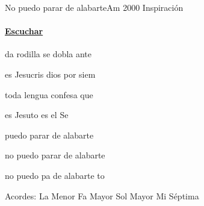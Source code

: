 \documentclass[12pt, spanish]{book}
\begin{document}
    \begin{song}{No puedo parar de alabarte}{Am}
        {2000} %
        {Inspiración}
        {} %
        {}
        \ifChordBk
          \paragraph{\mbox{}\hfill\protect\href{https://open.spotify.com/intl-es/track/6jpUq8t6XhYk9lFXzltnaT}{Escuchar}\mbox{}\hfill}
        \fi


        \begin{SBOpGroup}
            da rodilla se dobla ante 

            es Jesucris dios por siem

             toda lengua confesa que 

            es Jesuto es el Se
        \end{SBOpGroup}

        \begin{SBChorus}
             puedo parar de alabarte 

            no puedo parar de alabarte 

            no puedo pa de alabarte to
        \end{SBChorus}

        \ifChordBk
        \begin{SBOpGroup}
            Acordes:\break
            \upchord{\Am}\qquad La Menor \hfill
            \upchord{\F}\qquad Fa Mayor \hfill\null\break
            \upchord{\G}\qquad Sol Mayor \hfill
            \upchord{\Eseven}\qquad Mi S\'eptima \hfill\null\break
        \end{SBOpGroup}
        \fi
    \end{song}
\end{document}
